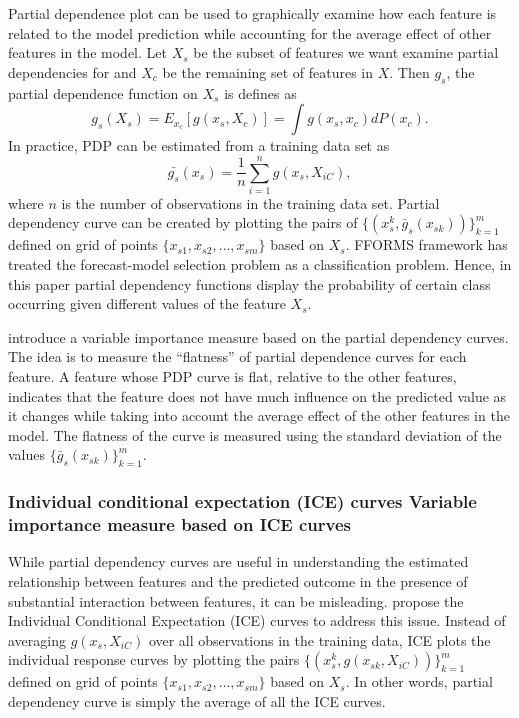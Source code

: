 \documentclass[11pt,a4paper,]{article}
\begin{document}
Partial dependence plot can be used to graphically examine how each feature is related to the model prediction while accounting for the average effect of other features in the model. Let \(X_s\) be the subset of features we want examine partial dependencies for and \(X_c\) be the remaining set of features in \(X\). Then \(g_s\), the partial dependence function on \(X_s\) is defines as
\[g_s(X_s)=E_{x_c}[g(x_s, X_c)]=\int{g(x_s, x_c)dP(x_c).}\]
In practice, PDP can be estimated from a training data set as
\[\bar{g_s}(x_s)=\frac{1}{n}\sum_{i=1}^{n}g(x_s, X_{iC}),\]
where \(n\) is the number of observations in the training data set. Partial dependency curve can be created by plotting the pairs of \(\{(x_s^k, \bar{g}_s(x_{sk}))\}_{k=1}^{m}\) defined on grid of points \(\{x_{s1}, x_{s2},\dots, x_{sm}\}\) based on \(X_s\). FFORMS framework has treated the forecast-model selection problem as a classification problem. Hence, in this paper partial dependency functions display the probability of certain class occurring given different values of the feature \(X_s\).

\textcite{Greenwell2018} introduce a variable importance measure based on the partial dependency curves. The idea is to measure the ``flatness'' of partial dependence curves for each feature. A feature whose PDP curve is flat, relative to the other features, indicates that the feature does not have much influence on the predicted value as it changes while taking into account the average effect of the other features in the model. The flatness of the curve is measured using the standard deviation of the values \(\{\bar{g}_{s}(x_{sk})\}_{k=1}^{m}\).

\hypertarget{individual-conditional-expectation-ice-curves-variable-importance-measure-based-on-ice-curves}{%
\subsubsection{Individual conditional expectation (ICE) curves Variable importance measure based on ICE curves}\label{individual-conditional-expectation-ice-curves-variable-importance-measure-based-on-ice-curves}}

While partial dependency curves are useful in understanding the estimated relationship between features and the predicted outcome in the presence of substantial interaction between features, it can be misleading. \textcite{goldstein2015peeking} propose the Individual Conditional Expectation (ICE) curves to address this issue. Instead of
averaging \(g(x_s, X_{iC})\) over all observations in the training data, ICE plots the individual response curves by plotting the pairs \(\{(x_s^k, g(x_{sk}, X_{iC}))\}_{k=1}^{m}\) defined on grid of points \(\{x_{s1}, x_{s2},\dots, x_{sm}\}\) based on \(X_s\). In other words, partial dependency curve is simply the average of all the ICE curves.
\end{document}
